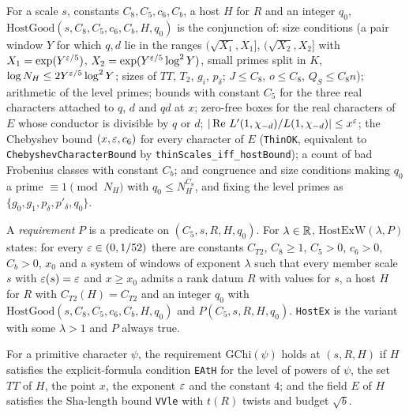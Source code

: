 \begin{definition}\label{host:host-good}
For a scale $s$, constants $C_8,C_5,c_6,C_b$, a host $H$ for $R$ and an
integer $q_0$, $\mathrm{HostGood}(s,C_8,C_5,c_6,C_b,H,q_0)$ is the
conjunction of: size conditions (a pair window $Y$ for which $q,d$ lie in
the ranges $(\sqrt{X_1},X_1]$, $(\sqrt{X_2},X_2]$ with
$X_1=\exp(Y^{\varepsilon/5})$, $X_2=\exp(Y^{\varepsilon/5}\log^2Y)$, small primes split
in $K$, $\log N_H\le2Y^{\varepsilon/5}\log^2Y$; sizes of $TT$, $T_2$, $g_i$,
$p_{\delta}$; $J\le C_8$, $o\le C_8$, $Q_S\le C_8n$); arithmetic of the level
primes; bounds with constant $C_5$ for the three real characters attached
to $q$, $d$ and $qd$ at $x$; zero-free boxes for the real characters of $E$
whose conductor is divisible by $q$ or $d$; $|\operatorname{Re}\,L'(1,\chi_{-d})/
L(1,\chi_{-d})|\le x^{\varepsilon}$; the Chebyshev bound $(x,\varepsilon,c_6)$ for every
character of $E$ (\texttt{ThinOK}, equivalent to
\texttt{ChebyshevCharacterBound} by \texttt{thinScales\_iff\_hostBound});
a count of bad Frobenius classes with constant $C_b$; and congruence and
size conditions making $q_0$ a prime $\equiv1\pmod{N_H}$ with $q_0\le
N_H^{C_8}$, and fixing the level primes as $\{g_0,g_1,p_{\delta},p'_{\delta},
q_0\}$.
\end{definition}

\begin{definition}\label{host:host-exw}
A \emph{requirement} $P$ is a predicate on $(C_5,s,R,H,q_0)$. For
$\lambda\in\mathbb{R}$, $\mathrm{HostExW}(\lambda,P)$ states: for every
$\varepsilon\in(0,1/52)$ there are constants $C_{T2}$, $C_8\ge1$, $C_5>0$,
$c_6>0$, $C_b>0$, $x_0$ and a system of windows of exponent $\lambda$ such
that every member scale $s$ with $\varepsilon(s)=\varepsilon$ and $x\ge x_0$ admits a rank
datum $R$ with values for $s$, a host $H$ for $R$ with
$C_{T2}(H)=C_{T2}$ and an integer $q_0$ with
$\mathrm{HostGood}(s,C_8,C_5,c_6,C_b,H,q_0)$ and $P(C_5,s,R,H,q_0)$.
\texttt{HostEx} is the variant with some $\lambda>1$ and $P$ always true.
\end{definition}

\begin{definition}\label{host:gchi}
For a primitive character $\psi$, the requirement $\mathrm{GChi}(\psi)$
holds at $(s,R,H)$ if $H$ satisfies the explicit-formula condition
\texttt{EAtH} for the level of powers of $\psi$, the set $TT$ of $H$, the
point $x$, the exponent $\varepsilon$ and the constant $4$; and the field $E$ of
$H$ satisfies the Sha-length bound \texttt{VVle} with $t(R)$ twists and
budget $\sqrt b$.
\end{definition}

